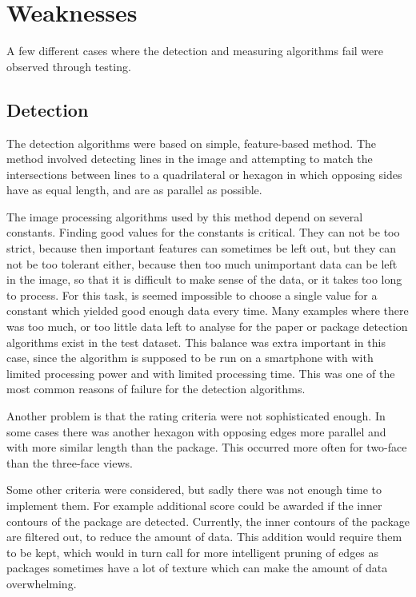 \section{Weaknesses} \label{discussion:weaknesses}
A few different cases where the detection and measuring algorithms fail were observed through testing.

\subsection{Detection}
The detection algorithms were based on simple, feature-based method. 
The method involved detecting lines in the image and attempting to match the intersections between lines to a quadrilateral or hexagon in which opposing sides have as equal length, and are as parallel as possible.

The image processing algorithms used by this method depend on several constants.
Finding good values for the constants is critical.
They can not be too strict, because then important features can sometimes be left out, but they can not be too tolerant either, because then too much unimportant data can be left in the image, so that it is difficult to make sense of the data, or it takes too long to process.
For this task, is seemed impossible to choose a single value for a constant which yielded good enough data every time.
Many examples where there was too much, or too little data left to analyse for the paper or package detection algorithms exist in the test dataset.
This balance was extra important in this case, since the algorithm is supposed to be run on a smartphone with with limited processing power and with limited processing time.
This was one of the most common reasons of failure for the detection algorithms.

Another problem is that the rating criteria were not sophisticated enough.
In some cases there was another hexagon with opposing edges more parallel and with more similar length than the package.
This occurred more often for two-face than the three-face views.

Some other criteria were considered, but sadly there was not enough time to implement them.
For example additional score could be awarded if the inner contours of the package are detected.
Currently, the inner contours of the package are filtered out, to reduce the amount of data.
This addition would require them to be kept, which would in turn call for more intelligent pruning of edges as packages sometimes have a lot of texture which can make the amount of data overwhelming.

